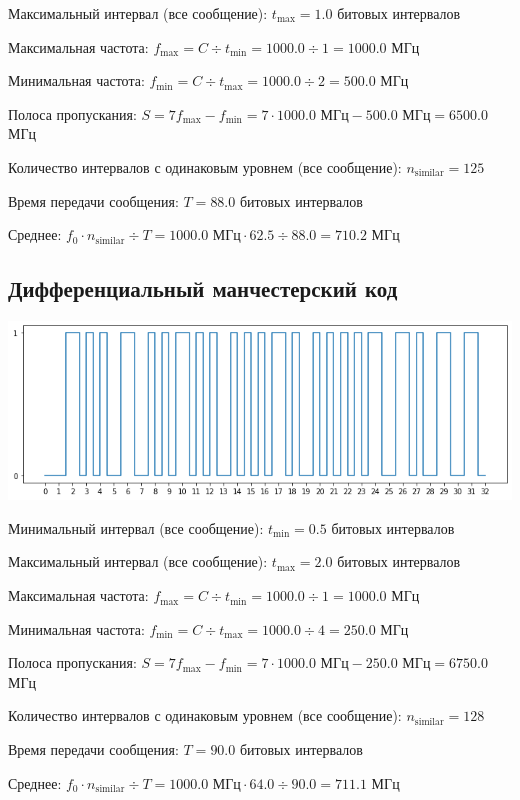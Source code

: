 Максимальный интервал (все сообщение): $t_\mathrm{max}=1.0$ битовых интервалов

Максимальная частота: $f_\mathrm{max}=C\div t_\mathrm{min}=1000.0\div 1=1000.0$ МГц

Минимальная частота: $f_\mathrm{min}=C\div t_\mathrm{max}=1000.0\div 2=500.0$ МГц

Полоса пропускания: $S=7f_\mathrm{max}-f_\mathrm{min} = 7\cdot 1000.0\text{ МГц}-500.0\text{ МГц}=6500.0$ МГц

Количество интервалов с одинаковым уровнем (все сообщение): $n_\mathrm{similar}=125$

Время передачи сообщения: $T=88.0$ битовых интервалов

Среднее: $f_0\cdot n_\mathrm{similar}\div T=1000.0\text{ МГц}\cdot 62.5\div 88.0=710.2$ МГц

\subsection{Дифференциальный манчестерский код}
\includegraphics[width=\textwidth]{3manchester_diff}


Минимальный интервал (все сообщение): $t_\mathrm{min}=0.5$ битовых интервалов

Максимальный интервал (все сообщение): $t_\mathrm{max}=2.0$ битовых интервалов

Максимальная частота: $f_\mathrm{max}=C\div t_\mathrm{min}=1000.0\div 1=1000.0$ МГц

Минимальная частота: $f_\mathrm{min}=C\div t_\mathrm{max}=1000.0\div 4=250.0$ МГц

Полоса пропускания: $S=7f_\mathrm{max}-f_\mathrm{min} = 7\cdot 1000.0\text{ МГц}-250.0\text{ МГц}=6750.0$ МГц

Количество интервалов с одинаковым уровнем (все сообщение): $n_\mathrm{similar}=128$

Время передачи сообщения: $T=90.0$ битовых интервалов

Среднее: $f_0\cdot n_\mathrm{similar}\div T=1000.0\text{ МГц}\cdot 64.0\div 90.0=711.1$ МГц

